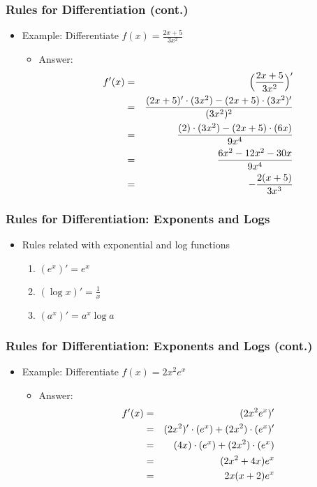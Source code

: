 \documentclass[pdflatex, 12pt]{beamer}
\begin{document}
\begin{frame}
\frametitle{Rules for Differentiation (cont.)}
\begin{itemize}
\item Example: Differentiate $f(x) = \frac{2x + 5}{3x^2}$
\vspace{0.4cm}
 \begin{itemize}
 \item Answer: 
 \begin{eqnarray}
 f'(x) &=& \Big(\frac{2x + 5}{3x^2}\Big)' \notag \\
 &=& \frac{(2x + 5)' \cdot (3x^2) - (2x + 5) \cdot (3x^2)'}{(3x^2)^2} \notag \\
 &=& \frac{(2) \cdot (3x^2) - (2x + 5) \cdot (6x)}{9x^4} \notag \\
 &=& \frac{6x^2 - 12x^2 - 30x}{9x^4} \notag \\
 &=& -\frac{2(x + 5)}{3x^3} \notag
 \end{eqnarray}
 \end{itemize}	
\end{itemize}
\end{frame}	

\begin{frame}
\frametitle{Rules for Differentiation: Exponents and Logs}
\begin{itemize}
\item Rules related with exponential and log functions
 \begin{enumerate}
 \item $(e^x)' = e^x$
 \item $(\log x)' = \frac{1}{x}$
 \item $(a^x)' = a^x \log a$
 \end{enumerate}
\end{itemize}
\end{frame}

\begin{frame}
\frametitle{Rules for Differentiation: Exponents and Logs (cont.)}
\begin{itemize}
\item Example: Differentiate $f(x) = 2x^2 e^x$
\vspace{0.4cm}
 \begin{itemize}
 \item Answer: 
 \begin{eqnarray}
 f'(x) &=& (2x^2 e^x)' \notag \\
 &=& (2x^2)' \cdot (e^x) + (2x^2) \cdot (e^x)' \notag \\
 &=& (4x) \cdot (e^x) + (2x^2) \cdot (e^x) \notag \\
 &=& (2x^2 + 4x) e^x \notag \\
 &=& 2x(x + 2) e^x \notag
 \end{eqnarray}
 \end{itemize}
\end{itemize}
\end{frame}
\end{document}
